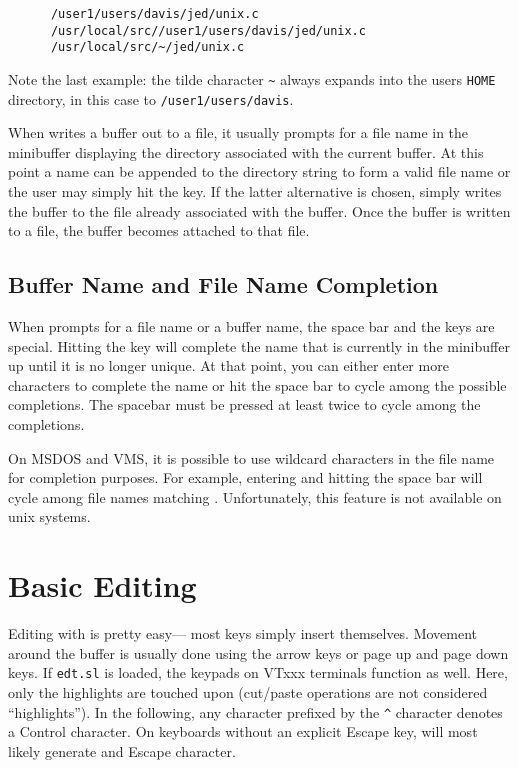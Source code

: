 \begin{verbatim}
      /user1/users/davis/jed/unix.c
      /usr/local/src//user1/users/davis/jed/unix.c
      /usr/local/src/~/jed/unix.c
\end{verbatim}

  Note the last example: the tilde character \verb|~| always expands into
  the users \verb|HOME| directory, in this case to \verb|/user1/users/davis|.

  When \jed{} writes a buffer out to a file, it usually prompts for a file name
  in the minibuffer displaying the directory associated with the current
  buffer.  At this point a name can be appended to the directory string to
  form a valid file name or the user may simply hit the  key.  If
  the latter alternative is chosen, \jed{} simply writes the buffer to the file
  already associated with the buffer.  Once the buffer is written to a file,
  the buffer becomes attached to that file.

\subsection{Buffer Name and File Name Completion}

  When \jed{} prompts for a file name or a buffer name, the space bar and
  the  keys are special.  Hitting the  key will complete
  the name that is currently in the minibuffer up until it is no longer
  unique. At that point, you can either enter more characters to complete
  the name or hit the space bar to cycle among the possible completions.
  The spacebar must be pressed at least twice to cycle among the
  completions.

  On MSDOS and VMS, it is possible to use wildcard characters in the file
  name for completion purposes.  For example, entering  and hitting
  the space bar will cycle among file names matching .
  Unfortunately, this feature is not available on unix systems.

\section{Basic Editing}

  Editing with \jed{} is pretty easy--- most keys simply insert themselves.
  Movement around the buffer is usually done using the arrow keys or page up
  and page down keys.  If \verb|edt.sl| is loaded, the keypads on VTxxx
  terminals function as well.  Here, only the highlights are touched upon
  (cut/paste operations are not considered ``highlights''). In the
  following, any character prefixed by the \verb|^| character denotes a
  Control character. On keyboards without an explicit Escape key,
  \key{Ctrl-[} will most likely generate and Escape character.

